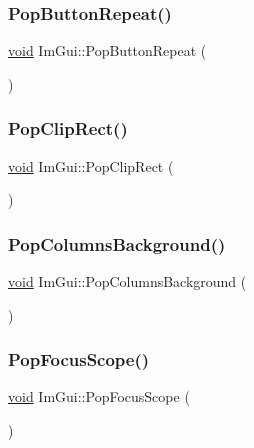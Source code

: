 \subsubsection{\texorpdfstring{Pop\+Button\+Repeat()}{PopButtonRepeat()}}
{\footnotesize\ttfamily \hyperlink{imgui__impl__opengl3__loader_8h_ac668e7cffd9e2e9cfee428b9b2f34fa7}{void} Im\+Gui\+::\+Pop\+Button\+Repeat (\begin{DoxyParamCaption}{ }\end{DoxyParamCaption})}

\mbox{\label{namespaceImGui_aef1c8a6e5a3c70cb10d03d2a2a66dfd8}} 
\subsubsection{\texorpdfstring{Pop\+Clip\+Rect()}{PopClipRect()}}
{\footnotesize\ttfamily \hyperlink{imgui__impl__opengl3__loader_8h_ac668e7cffd9e2e9cfee428b9b2f34fa7}{void} Im\+Gui\+::\+Pop\+Clip\+Rect (\begin{DoxyParamCaption}{ }\end{DoxyParamCaption})}

\mbox{\label{namespaceImGui_a27c737fa1fc79164fc7d840e858b1845}} 
\subsubsection{\texorpdfstring{Pop\+Columns\+Background()}{PopColumnsBackground()}}
{\footnotesize\ttfamily \hyperlink{imgui__impl__opengl3__loader_8h_ac668e7cffd9e2e9cfee428b9b2f34fa7}{void} Im\+Gui\+::\+Pop\+Columns\+Background (\begin{DoxyParamCaption}{ }\end{DoxyParamCaption})}

\mbox{\label{namespaceImGui_a660bc1ff7f6d971fc4b4236e87409b38}} 
\subsubsection{\texorpdfstring{Pop\+Focus\+Scope()}{PopFocusScope()}}
{\footnotesize\ttfamily \hyperlink{imgui__impl__opengl3__loader_8h_ac668e7cffd9e2e9cfee428b9b2f34fa7}{void} Im\+Gui\+::\+Pop\+Focus\+Scope (\begin{DoxyParamCaption}{ }\end{DoxyParamCaption})}

